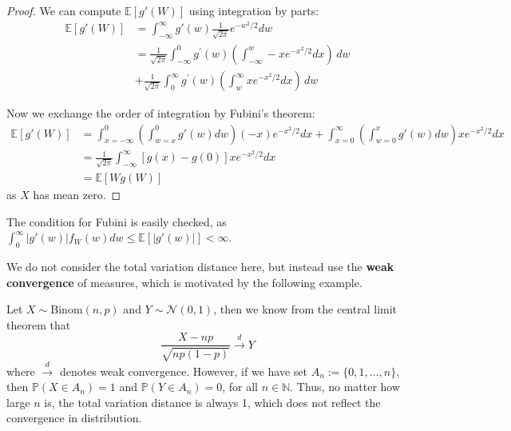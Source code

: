 \documentclass{article}
\begin{document}
\begin{proof}
    We can compute $\mathbb{E}[g'(W)]$ using integration by parts:
    \begin{align*}
        \mathbb{E}[g'(W)] &= \int_{-\infty}^\infty g'(w) \frac{1}{\sqrt{2\pi}} e^{-w^2/2} dw\\
        &= {\frac{1}{\sqrt{2\pi}}}\int_{-\infty}^{0}g^{\prime}(w)\left(\int_{-\infty}^{w}-x e^{-x^{2}/2}d x\right)\,d w \\
        &+ {\frac{1}{\sqrt{2\pi}}}\int_{0}^{\infty}g^{\prime}(w)\left(\int_{w}^{\infty}x e^{-x^{2}/2}d x\right)\,d w
    \end{align*}

    Now we exchange the order of integration by Fubini's theorem:
    \begin{align*}
        \mathbb{E}[g'(W)] &= \int_{x=-\infty}^0 \left(\int_{w=x}^0 g'(w) dw\right) (-x) e^{-x^2/2} dx + \int_{x=0}^\infty \left(\int_{w=0}^x g'(w) dw\right) xe^{-x^2/2} dx\\
        &={\frac{1}{\sqrt{2\pi}}}\int_{-\infty}^{\infty}[g(x)-g(0)]x e^{-x^{2}/2}d x \\
        &=\mathbb{E}[W g(W)]
    \end{align*}
    as $X$ has mean zero.
\end{proof}

\begin{unexaminable}
    The condition for Fubini is easily checked, as $\int_0^\infty |g'(w)| f_W(w) dw \leq \mathbb{E}[|g'(w)|] < \infty$.
\end{unexaminable}

We do not consider the total variation distance here, but instead use the \textbf{weak convergence} of measures, which is motivated by the following example.  

\begin{example}

    Let $X\sim \mathrm{Binom}(n,p)$ and $Y\sim \mathcal{N}(0,1)$, then we know from the central limit theorem that
    \begin{equation*}
        \frac{X-np}{\sqrt{np(1-p)}} \xrightarrow{d} Y
    \end{equation*}
    where $\xrightarrow{d}$ denotes weak convergence. However, if we have set $A_n :=\{0, 1, \ldots, n\}$, then $\mathbb{P}(X\in A_n) = 1$ and $\mathbb{P}(Y\in A_n) = 0$, for all $n\in \mathbb{N}$. Thus, no matter how large $n$ is, the total variation distance is always 1, which does not reflect the convergence in distribution.  
\end{example}
\end{document}
